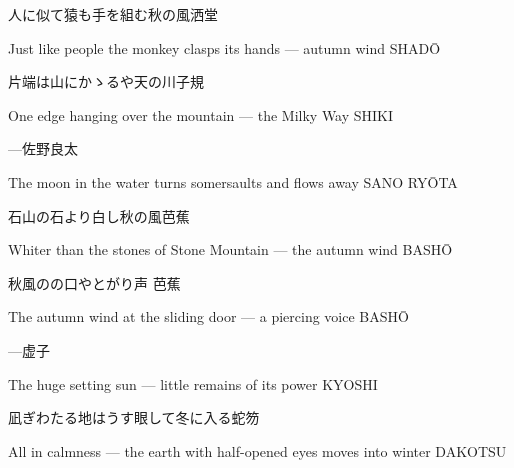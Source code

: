 \begin{haiku}
    {\FH 人に似て猿も手を組む秋の風}\hfill{\FH 洒堂}

    \vin{} Just like people
    \vin{} \vin{} the monkey clasps its hands ---
    \vin{} \vin{} \vin{} autumn wind \hspace{\fill} SHAD\={O}
\end{haiku}

\begin{haiku}
    {\FH 片端は山にかゝるや天の川}\hfill{\FH 子規}

    \vin{} One edge
    \vin{} \vin{} hanging over the mountain ---
    \vin{} \vin{} \vin{} the Milky Way \hspace{\fill} SHIKI
\end{haiku}

\begin{haiku}
    {---}\hfill{\FH 佐野良太}

    \vin{} The moon in the water
    \vin{} \vin{} turns somersaults
    \vin{} \vin{} \vin{} and flows away \hspace{\fill} SANO RY\={O}TA
\end{haiku}

\begin{haiku}
    {\FH 石山の石より白し秋の風}\hfill{\FH 芭蕉}

    \vin{} Whiter than
    \vin{} \vin{} the stones of Stone Mountain ---
    \vin{} \vin{} \vin{} the autumn wind \hspace{\fill} BASH\={O}
\end{haiku}

\begin{haiku}
    {\FH 秋風のの口やとがり声 }\hfill{\FH 芭蕉}

    \vin{} The autumn wind
    \vin{} \vin{} at the sliding door ---
    \vin{} \vin{} \vin{} a piercing voice \hspace{\fill} BASH\={O}
\end{haiku}

\begin{haiku}
    {---}\hfill{\FH 虚子}

    \vin{} The huge setting sun ---
    \vin{} \vin{} little remains of
    \vin{} \vin{} \vin{} its power \hspace{\fill} KYOSHI
\end{haiku}

\begin{haiku}
    {\FH 凪ぎわたる地はうす眼して冬に入る}\hfill{\FH 蛇笏}

    \vin{} All in calmness ---
    \vin{} \vin{} the earth with half-opened eyes
    \vin{} \vin{} \vin{} moves into winter \hspace{\fill} DAKOTSU
\end{haiku}


